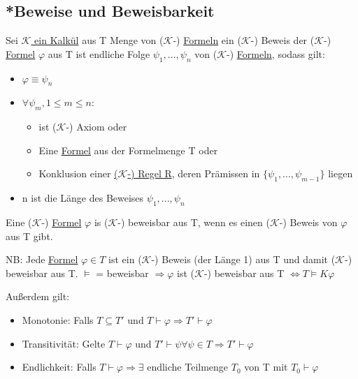 \documentclass[12pt,a4paper]{article} %
\begin{document}
	\subsection{*Beweise und Beweisbarkeit}
	\label{Beweisbar}
	Sei \hyperref[Kalkul]{$\mathcal{K}$ ein Kalkül} aus T Menge von ($\mathcal{K}$-) \hyperref[Formel]{Formeln} ein ($\mathcal{K}$-) Beweis der ($\mathcal{K}$-) \hyperref[Formel]{Formel} $\varphi$ aus T ist endliche Folge $\psi_1, ..., \psi_n$ von ($\mathcal{K}$-) \hyperref[Formel]{Formeln}, sodass gilt:
	\begin{itemize}
		\item $\varphi \equiv \psi_n$
		\item $\forall \psi_m, 1 \le m \le n:$ \begin{itemize}
			\item ist ($\mathcal{K}$-) Axiom oder
			\item Eine \hyperref[Formel]{Formel} aus der Formelmenge T oder
			\item Konklusion einer \hyperref[Kalkul]{($\mathcal{K}$-) Regel R}, deren Prämissen in $\{\psi_1, ..., \psi_{m - 1}\}$ liegen
		\end{itemize}
		\item n ist die Länge des Beweises $\psi_1, ..., \psi_n$
	\end{itemize}
	
	Eine ($\mathcal{K}$-) \hyperref[Formel]{Formel} $\varphi$ is ($\mathcal{K}$-) beweisbar aus T, wenn es einen ($\mathcal{K}$-) Beweis von $\varphi$ aus T gibt.
	
	NB: Jede \hyperref[Formel]{Formel} $\varphi \in T$ ist ein ($\mathcal{K}$-) Beweis (der Länge 1) aus T und damit
	($\mathcal{K}$-) beweisbar aus T.
	$\hyperref[Erfullbar]{\vDash}$ = beweisbar $\Rightarrow \varphi$ ist ($\mathcal{K}$-) beweisbar aus T $\Leftrightarrow T \hyperref[Erfullbar]{\vDash} K \varphi$
	
	Außerdem gilt:
	
	\begin{itemize}
		\item Monotonie: Falls $T \subseteq T'$ und $T \hyperref[Beweisbar]{\vdash} \varphi \Rightarrow T' \hyperref[Beweisbar]{\vdash} \varphi$
		\item Transitivität: Gelte $T \hyperref[Beweisbar]{\vdash} \varphi$ und $T' \hyperref[Beweisbar]{\vdash} \psi \forall \psi \in T \Rightarrow T' \hyperref[Beweisbar]{\vdash} \varphi$ 
		\item Endlichkeit: Falls $T \hyperref[Beweisbar]{\vdash} \varphi \Rightarrow \exists$ endliche Teilmenge $T_0$ von T mit $T_0 \hyperref[Beweisbar]{\vdash} \varphi$
	\end{itemize}
\end{document}
